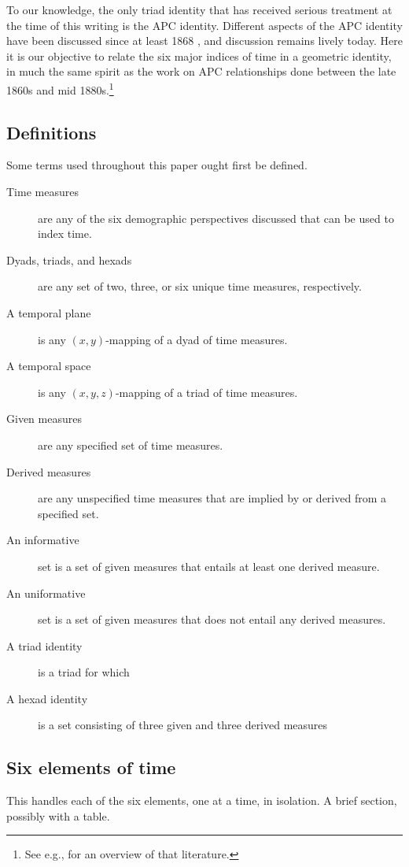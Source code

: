 \documentclass[11pt,oneside,a4paper]{article} %
\newcommand\eg[1]{\textcolor{bl}{#1}}
\begin{document}
To our knowledge, the only triad identity that has received serious
treatment at the time of this writing is the \eg{APC} identity. Different
aspects of the \eg{APC} identity have been discussed since at least 1868
\citep{knapp1868ermittlung}, and discussion remains lively today. Here it is our
objective to relate the six major indices of time in a geometric identity, in
much the same spirit as the work on \eg{APC} relationships done between the late
1860s and mid 1880s.\footnote{See e.g., \citet{keiding2011age} for an overview of that literature.} 

\subsection*{Definitions}
Some terms used throughout this paper ought first be defined.
\begin{description}
\item[Time measures] are any of the six demographic perspectives discussed that
can be used to index time. 
\item[Dyads, triads, and hexads] are any set of two, three, or six unique time
measures, respectively.
\item[A temporal plane] is any $(x,y)$-mapping of a dyad of time measures.
\item[A temporal space] is any $(x,y,z)$-mapping of a triad of time measures.
\item[Given measures] are any specified set of time measures.
\item[Derived measures] are any unspecified time measures that are implied by or
derived from a specified set. 
\item[An informative] set is a set of given measures that entails at
least one derived measure.
\item[An uniformative] set is a set of given measures that does not entail any
derived measures.
\item[A triad identity] is a triad for which 
\item[]
\item[A hexad identity] is a set consisting of three given and three derived
measures
\end{description}


\subsection*{Six elements of time}
This handles each of the six elements, one at a time, in isolation. A brief
section, possibly with a table.
\end{document}
